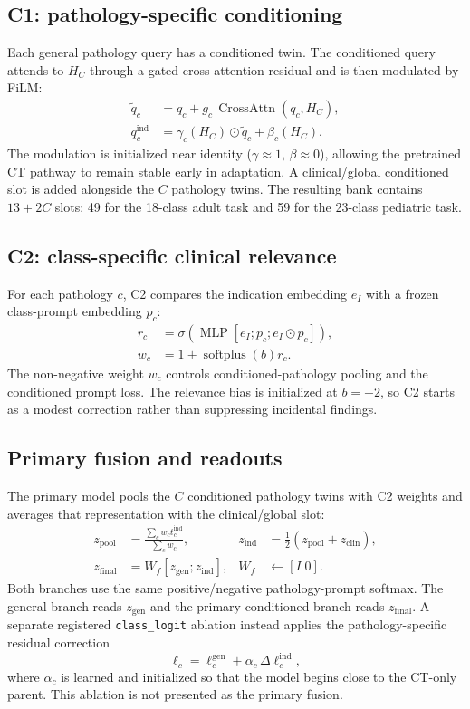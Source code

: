 \documentclass[10pt,twocolumn]{article}
\begin{document}
\subsection{C1: pathology-specific conditioning}
Each general pathology query has a conditioned twin. The conditioned query
attends to $H_C$ through a gated cross-attention residual and is then modulated
by FiLM:
\begin{align}
\widetilde q_c &= q_c + g_c\,
  \operatorname{CrossAttn}(q_c,H_C),\\
q^{\mathrm{ind}}_c &= \gamma_c(H_C)\odot \widetilde q_c + \beta_c(H_C).
\end{align}
The modulation is initialized near identity ($\gamma\approx1$,
$\beta\approx0$), allowing the pretrained CT pathway to remain stable early in
adaptation. A clinical/global conditioned slot is added alongside the $C$
pathology twins. The resulting bank contains $13+2C$ slots: 49 for the
18-class adult task and 59 for the 23-class pediatric task.

\subsection{C2: class-specific clinical relevance}
For each pathology $c$, C2 compares the indication embedding $e_I$ with a
frozen class-prompt embedding $p_c$:
\begin{align}
r_c &= \sigma\!\left(\operatorname{MLP}
  [e_I;p_c;e_I\odot p_c]\right),\\
w_c &= 1+\operatorname{softplus}(b)r_c.
\end{align}
The non-negative weight $w_c$ controls conditioned-pathology pooling and the
conditioned prompt loss. The relevance bias is initialized at $b=-2$, so C2
starts as a modest correction rather than suppressing incidental findings.

\subsection{Primary fusion and readouts}
The primary model pools the $C$ conditioned pathology twins with C2 weights
and averages that representation with the clinical/global slot:
\begin{align}
z_{\mathrm{pool}} &= \frac{\sum_c w_c t_c^{\mathrm{ind}}}{\sum_c w_c}, &
z_{\mathrm{ind}} &= \tfrac12(z_{\mathrm{pool}}+z_{\mathrm{clin}}),\\
z_{\mathrm{final}} &= W_f[z_{\mathrm{gen}};z_{\mathrm{ind}}], &
W_f &\leftarrow [I\;0].
\end{align}
Both branches use the same positive/negative pathology-prompt softmax. The
general branch reads $z_{\mathrm{gen}}$ and the primary conditioned branch
reads $z_{\mathrm{final}}$. A separate registered \texttt{class\_logit}
ablation instead applies the pathology-specific residual correction
\begin{equation}
\ell_c = \ell^{\mathrm{gen}}_c + \alpha_c\,
\Delta\ell^{\mathrm{ind}}_c,
\end{equation}
where $\alpha_c$ is learned and initialized so that the model begins close to
the CT-only parent. This ablation is not presented as the primary fusion.
\end{document}
